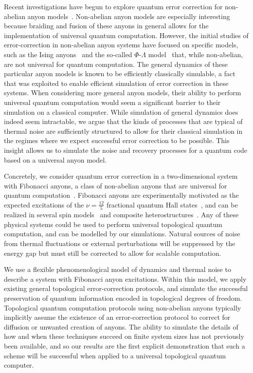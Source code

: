 Recent investigations have begun to
explore quantum error correction for non-abelian anyon
models~\cite{Brell2013, Wootton2013, Hutter2014, Wootton2015b, Hutter2015continuous}.
Non-abelian anyon models are especially interesting 
because braiding and fusion of
these anyons in general allows for the implementation of universal quantum 
computation. However, the initial studies
of error-correction in non-abelian anyon
systems have focused on specific models, such as the Ising 
anyons~\cite{Brell2013, Hutter2015continuous} and the so-called $\Phi$-$\Lambda$
model~\cite{Wootton2013, Hutter2014} that, while non-abelian,
are not universal for quantum
computation. The general dynamics of
these particular anyon models is
known to be efficiently classically simulable, a fact
that was exploited to enable efficient simulation of error correction
in these systems. When considering more general anyon models, their 
ability to perform universal quantum computation would seem a significant
barrier to their simulation on a classical computer. While simulation 
of general dynamics does indeed seem intractable, we argue that 
the kinds of processes that are typical of thermal noise 
are sufficiently structured  to allow for their classical simulation
in the regimes where we expect successful error correction to
be possible. This insight allows us to simulate the noise
and recovery processes for a quantum code based on a universal anyon model.

Concretely, we consider quantum error correction in a two-dimensional
system with Fibonacci anyons, a class of non-abelian anyons that are universal for quantum
computation~\cite{Freedman2002, Nayak2008}. Fibonacci anyons are
experimentally motivated as the
expected excitations of the $\nu=\frac{12}{5}$ fractional quantum Hall
states~\cite{Slingerland2001}, and can be realized in several spin
models~\cite{Levin2005, Bonesteel2012, Kapit2013, Palumbo2014} and composite
heterostructures~\cite{Mong2014}.
Any of these physical systems
could be used to perform
universal topological quantum computation, and
can be modelled by our
simulations. Natural sources of noise
from thermal fluctuations or external
perturbations will be suppressed by
the energy gap but must still be corrected to allow for scalable computation.

We use a flexible phenomenological model of dynamics and thermal
noise to describe a system with Fibonacci anyon excitations. Within
this model, we apply existing general topological error-correction protocols, and
simulate the successful preservation of quantum information encoded in topological
degrees of freedom. Topological quantum computation protocols using non-abelian anyons
typically implicitly assume the existence of an error-correction protocol to
correct for diffusion or unwanted creation of anyons.
The ability to simulate the details of how and when
these techniques succeed on finite
system sizes has not previously
been available, and so our
results are the first explicit
demonstration that such a scheme
will be successful when applied
to a universal topological quantum computer.


